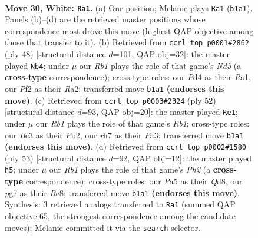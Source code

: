 \documentclass[11pt]{article}
\begin{document}
\clearpage

\begin{figure}[p]\centering
\begin{subfigure}{0.46\textwidth}\centering
\resizebox{\linewidth}{!}{%
\newchessgame
\chessboard[
  setfen={rk3b2/pp4pr/2p1b2p/P2p1p2/3P3P/2B1P3/qPK2PPN/1R3Q1R w - - 11 30},
  showmover=false,
  pgfstyle=straightmove, color=movearrow, markmove={b1-a1}
]}
\caption{}
\end{subfigure}\hfill
\begin{subfigure}{0.46\textwidth}\centering
\resizebox{\linewidth}{!}{%
\newchessgame
\chessboard[
  setfen={1r3r2/3b1pkp/3p2p1/2qNp1b1/p3P3/2PB4/RP2QPPP/R5K1 w - - 2 25},
  showmover=false,
  pgfstyle=straightmove, color=movearrow, markmove={d5-b4}
]}
\caption{}
\end{subfigure}
\\[4pt]
\begin{subfigure}{0.46\textwidth}\centering
\resizebox{\linewidth}{!}{%
\newchessgame
\chessboard[
  setfen={3r2k1/1p1rpp2/5b1p/p1q1pPp1/4B3/PR3QPP/1PP2P2/1R4K1 w - - 7 27},
  showmover=false,
  pgfstyle=straightmove, color=movearrow, markmove={b1-e1}
]}
\caption{}
\end{subfigure}\hfill
\begin{subfigure}{0.46\textwidth}\centering
\resizebox{\linewidth}{!}{%
\newchessgame
\chessboard[
  setfen={r2qr1k1/p5pp/3p4/PPpPpb2/2P2p2/5P2/1R1BQ1PP/R5K1 b - - 3 27},
  showmover=false,
  pgfstyle=straightmove, color=movearrow, markmove={h7-h5}
]}
\caption{}
\end{subfigure}
\caption{\textbf{Move 30, White: \texttt{Ra1}.} (a) Our position; Melanie plays \texttt{Ra1} (\texttt{b1a1}). Panels (b)--(d) are the retrieved master positions whose correspondence most drove this move (highest QAP objective among those that transfer to it). (b) Retrieved from \texttt{ccrl\_top\_p0001\#2862} (ply 48) [structural distance $d$=101, QAP obj=32]: the master played \texttt{Nb4}; under $\mu$ our \emph{Rb1} plays the role of that game's \emph{Nd5} (a \textbf{cross-type} correspondence); cross-type roles: our \emph{P}d4 as their \emph{R}a1, our \emph{P}f2 as their \emph{R}a2; transferred move \texttt{b1a1} \textbf{(endorses this move)}. (c) Retrieved from \texttt{ccrl\_top\_p0003\#2324} (ply 52) [structural distance $d$=93, QAP obj=20]: the master played \texttt{Re1}; under $\mu$ our \emph{Rb1} plays the role of that game's \emph{Rb1}; cross-type roles: our \emph{B}c3 as their \emph{P}b2, our \emph{r}h7 as their \emph{P}a3; transferred move \texttt{b1a1} \textbf{(endorses this move)}. (d) Retrieved from \texttt{ccrl\_top\_p0002\#1580} (ply 53) [structural distance $d$=92, QAP obj=12]: the master played \texttt{h5}; under $\mu$ our \emph{Rb1} plays the role of that game's \emph{Ph2} (a \textbf{cross-type} correspondence); cross-type roles: our \emph{P}a5 as their \emph{Q}d8, our \emph{p}g7 as their \emph{R}e8; transferred move \texttt{b1a1} \textbf{(endorses this move)}. Synthesis: 3 retrieved analogs transferred to \texttt{Ra1} (summed QAP objective 65, the strongest correspondence among the candidate moves); Melanie committed it via the \texttt{search} selector.}
\label{fig:thought-m58}
\end{figure}
\end{document}
